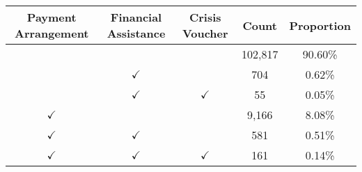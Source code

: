 \begin{tabular}{c|c|c|c|c}
\toprule 
\midrule 
Payment Arrangement & Financial Assistance & Crisis Voucher & Count & Proportion \\
\midrule 
 &  &  & 102,817 & 90.60\% \\
 & $\checkmark$ &  & 704 & 0.62\% \\
 & $\checkmark$ & $\checkmark$ & 55 & 0.05\% \\
$\checkmark$ &  &  & 9,166 & 8.08\% \\
$\checkmark$ & $\checkmark$ &  & 581 & 0.51\% \\
$\checkmark$ & $\checkmark$ & $\checkmark$ & 161 & 0.14\% \\
\midrule 
\bottomrule 
\end{tabular}
